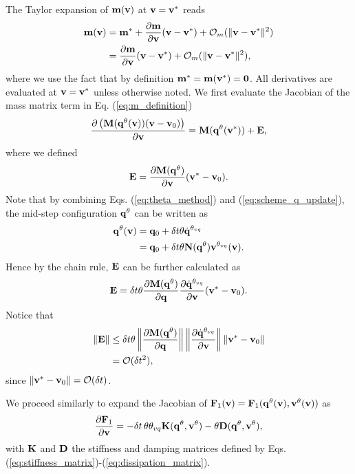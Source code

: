 The Taylor expansion of ${\mathbf{m}}({\mathbf{v}})$ at ${\mathbf{v}}={\mathbf{v}}^*$ reads
\begin{align}
	\mf{m}(\mf{v}) &= \mf{m}^* + \frac{\partial \mf{m}}{\partial \mf{v}} (\mf{v}-\mf{v}^*) +
	\mathcal{O}_m(\Vert\mf{v}-\mf{v}^*\Vert^2)\nonumber\\
	&=\frac{\partial \mf{m}}{\partial \mf{v}}(\mf{v}-\mf{v}^*) +
	\mathcal{O}_m(\Vert\mf{v}-\mf{v}^*\Vert^2),
	\label{eq:m_taylor_expansion}
\end{align}
where we use the fact that by definition ${\mathbf{m}}^*={\mathbf{m}}({\mathbf{v}}^*)={\mathbf{0}}$. All
derivatives are evaluated at ${\mathbf{v}} = {\mathbf{v}}^*$ unless otherwise noted. We
first evaluate the Jacobian of the mass matrix term in Eq.
(\ref{eq:m_definition})
\begin{align*}
	\frac{\partial \left( {\mathbf{M}}({\mathbf{q}}^{\theta}({\mathbf{v}}))({\mathbf{v}}-{\mathbf{v}}_0) \right)}{\partial {\mathbf{v}}}
	= {\mathbf{M}}({\mathbf{q}}^{\theta}({\mathbf{v}}^*)) + {\mathbf{E}},
\end{align*}
where we defined
\begin{align*}
	{\mathbf{E}} = \frac{\partial {\mathbf{M}}({\mathbf{q}}^{\theta})}{\partial{\mathbf{v}}} ({\mathbf{v}}^*-{\mathbf{v}}_0).
\end{align*}
Note that by combining Eqs. (\ref{eq:theta_method}) and (\ref{eq:scheme_q_update}), the
mid-step configuration ${\mathbf{q}}^{\theta}$ can be written as
\begin{align*}
	{\mathbf{q}}^{\theta}({\mathbf{v}}) &= {\mathbf{q}}_0 + \delta t \theta \dot{{\mathbf{q}}}^{\theta_{vq}} \\
	                          &= {\mathbf{q}}_0 + \delta t \theta {\mathbf{N}}({\mathbf{q}}^{\theta}){\mathbf{v}}^{\theta_{vq}}({\mathbf{v}}).
\end{align*}
Hence by the chain rule, ${\mathbf{E}}$ can be further calculated as
\begin{align*}
	{\mathbf{E}} = \delta t\theta\frac{\partial {\mathbf{M}}({\mathbf{q}}^{\theta}) }{\partial{\mathbf{q}}}
             \frac{\partial\dot{{\mathbf{q}}}^{\theta_{vq}}}{\partial{\mathbf{v}}}
			 ({\mathbf{v}}^*-{\mathbf{v}}_0).
\end{align*}
Notice that 
\begin{align*}
		\Vert{\mathbf{E}}\Vert 
		&\le \delta t\theta \left\| \frac{\partial{\mathbf{M}}({\mathbf{q}}^{\theta})}{\partial{\mathbf{q}}}  \right\|
			\left\| \frac{\partial\dot{{\mathbf{q}}}^{\theta_{vq}}}{\partial{\mathbf{v}}}  \right\|
		    \left\| {\mathbf{v}}^*-{\mathbf{v}}_0 \right\| \\
		&= \mathcal{O}(\delta t^2),
\end{align*}
since $\Vert{\mathbf{v}}^*-{\mathbf{v}}_0\Vert = \mathcal{O}(\delta t)$.

We proceed similarly to expand the Jacobian of
${\mathbf{F}}_1({\mathbf{v}})={\mathbf{F}}_1({\mathbf{q}}^{\theta}({\mathbf{v}}), {\mathbf{v}}^{\theta}({\mathbf{v}}))$
as
\begin{align*}
	\frac{\partial{\mathbf{F}}_1}{\partial {\mathbf{v}}} = -\delta t\,\theta\theta_{vq}{\mathbf{K}}({\mathbf{q}}^{\theta},
	{\mathbf{v}}^{\theta})-\theta{\mathbf{D}}({\mathbf{q}}^{\theta}, {\mathbf{v}}^{\theta}),
\end{align*}
with ${\mathbf{K}}$ and ${\mathbf{D}}$ the stiffness and damping matrices defined by Eqs.
(\ref{eq:stiffness_matrix})-(\ref{eq:dissipation_matrix}).


